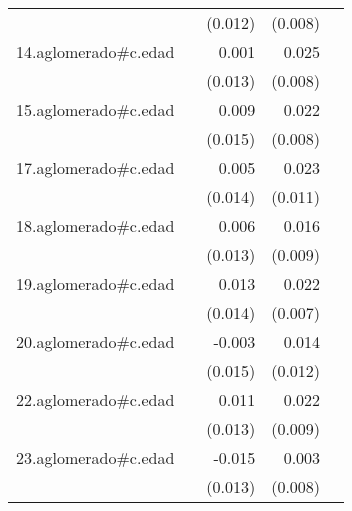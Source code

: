 {\begin{longtable}{l*{4}{D{.}{.}{-1}}}
            &                     &     (0.012)         &     (0.008)         &                     \\
\addlinespace
14.aglomerado#c.edad&                     &       0.001         &       0.025\sym{***}&                     \\
            &                     &     (0.013)         &     (0.008)         &                     \\
\addlinespace
15.aglomerado#c.edad&                     &       0.009         &       0.022\sym{**} &                     \\
            &                     &     (0.015)         &     (0.008)         &                     \\
\addlinespace
17.aglomerado#c.edad&                     &       0.005         &       0.023\sym{*}  &                     \\
            &                     &     (0.014)         &     (0.011)         &                     \\
\addlinespace
18.aglomerado#c.edad&                     &       0.006         &       0.016         &                     \\
            &                     &     (0.013)         &     (0.009)         &                     \\
\addlinespace
19.aglomerado#c.edad&                     &       0.013         &       0.022\sym{**} &                     \\
            &                     &     (0.014)         &     (0.007)         &                     \\
\addlinespace
20.aglomerado#c.edad&                     &      -0.003         &       0.014         &                     \\
            &                     &     (0.015)         &     (0.012)         &                     \\
\addlinespace
22.aglomerado#c.edad&                     &       0.011         &       0.022\sym{**} &                     \\
            &                     &     (0.013)         &     (0.009)         &                     \\
\addlinespace
23.aglomerado#c.edad&                     &      -0.015         &       0.003         &                     \\
            &                     &     (0.013)         &     (0.008)         &                     \\

\end{longtable}}
